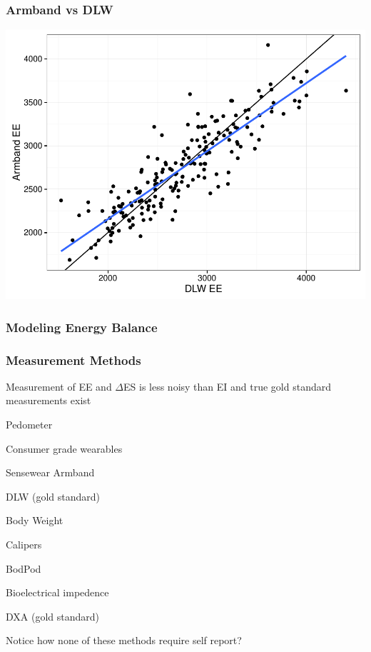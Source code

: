\documentclass[handout]{beamer}\usepackage[]{graphicx}\usepackage[]{color}
\newenvironment{knitrout}{}{} %
\begin{document}
\begin{frame}
\frametitle{Armband vs DLW}
\begin{knitrout}\tiny
{}\color{fgcolor}

{\centering \includegraphics[width=.8\linewidth]{figure/armbandvsdlw-1} 

}



\end{knitrout}
\end{frame}



\begin{frame}
\frametitle{Modeling Energy Balance}

\end{frame}

\begin{frame}
\frametitle{Measurement Methods}

Measurement of EE and $\Delta$ES is less noisy than EI and true gold standard measurements exist

\begin{itemize}
\begin{multicols}{2}
\item Pedometer
\item Consumer grade wearables
\item Sensewear Armband
\item DLW (gold standard)

\columnbreak
\item Body Weight
\item Calipers
\item BodPod
\item Bioelectrical impedence
\item DXA (gold standard)
\end{multicols}
\end{itemize}

Notice how none of these methods require self report? 

\end{frame}
\end{document}
